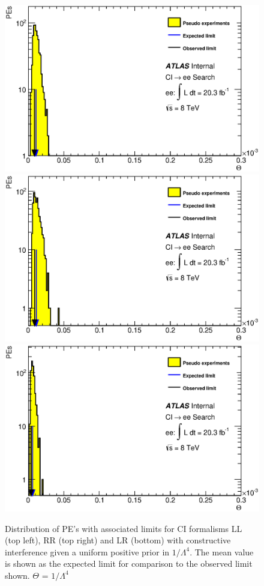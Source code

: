     \begin{figure}[h]
        \begin{center}
            \includegraphics[width=0.7\linewidth]{images/ee__LL_minus_L4/Theta.eps}
            \includegraphics[width=0.7\linewidth]{images/ee__RR_minus_L4/Theta.eps}
            \includegraphics[width=0.7\linewidth]{images/ee__LR_minus_L4/Theta.eps}
        \end{center}
       \caption{Distribution of PE's with associated limits for CI formalisms LL (top left), RR (top right) and LR (bottom) with constructive interference given a uniform positive prior in $1/\Lambda^{4}$. The mean value is shown as the expected limit for comparison to the observed limit shown. $\Theta$ = $1/\Lambda^{4}$}
       \label{fig:Theta_CI_con_4}
    \end{figure}


